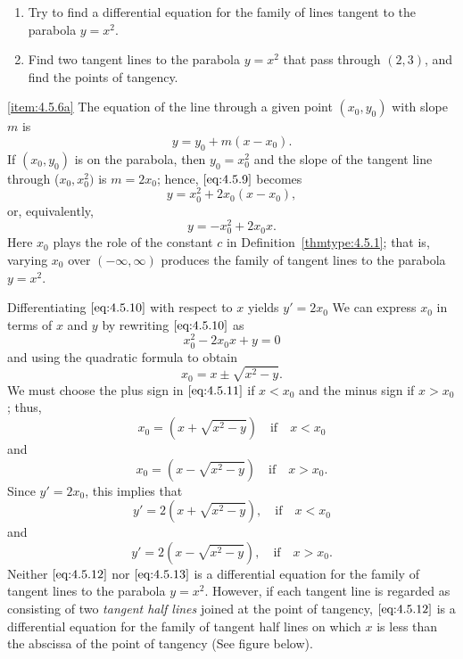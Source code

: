 \documentclass{ximera}
\begin{document}
\begin{example}\label{example:4.5.6}
 
\begin{enumerate}
\item\label{item:4.5.6a} %
Try to find a differential equation for the family of lines tangent
to the parabola $y=x^2$.
 
\item\label{item:4.5.6b} %
Find two tangent lines to  the parabola $y=x^2$ that pass
through $(2,3)$, and find the points of tangency.
\end{enumerate}
 
 
\begin{explanation} \ref{item:4.5.6a} The equation of the line through a given point
$(x_0,y_0)$ with slope $m$ is
\begin{equation}  \label{eq:4.5.9}
y=y_0+m(x-x_0).
\end{equation}
If $(x_0,y_0)$ is on the parabola, then $y_0=x_0^2$ and the slope of
the tangent line through ($x_0,x_0^2)$ is $m=2x_0$; hence,
$\eqref{eq:4.5.9}$ becomes
$$
y=x_0^2+2x_0(x-x_0),
$$
 or, equivalently,
\begin{equation} \label{eq:4.5.10}
y=-x_0^2+2x_0x.
\end{equation}
Here $x_0$ plays the role of the constant $c$ in
Definition~\ref{thmtype:4.5.1}; that is, varying $x_0$ over
$(-\infty,\infty)$ produces the family of tangent lines to the
parabola $y=x^2$.
 
 
Differentiating $\eqref{eq:4.5.10}$ with respect to $x$ yields
$y'=2x_0$
We can express $x_0$ in terms of $x$ and $y$ by rewriting
$\eqref{eq:4.5.10}$ as
$$
x_0^2-2x_0x+y=0
$$
and using the quadratic formula to obtain
 \begin{equation}\label{eq:4.5.11}
 x_0=x\pm\sqrt{x^2-y}.
\end{equation}
We must choose the plus sign in $\eqref{eq:4.5.11}$ if $x<x_0$
and the minus sign if $x>x_0$;   thus,
$$
x_0=\left(x+\sqrt{x^2-y}\right)\quad\mbox{if}\quad x<x_0
$$
 and
$$
x_0=\left(x-\sqrt{x^2-y}\right)\quad\mbox{if}\quad x>x_0.
$$
Since $y'=2x_0$, this implies that
\begin{equation} \label{eq:4.5.12}
y'=2\left(x+\sqrt{x^2-y}\right),\quad\mbox{if}\quad x<x_0
\end{equation}
 and
\begin{equation} \label{eq:4.5.13}
y'=2\left(x-\sqrt{x^2-y}\right),\quad \mbox{if}\quad x>x_0.
\end{equation}
Neither $\eqref{eq:4.5.12}$ nor $\eqref{eq:4.5.13}$ is a differential equation for
the family of tangent lines to the parabola $y=x^2$. However, if each
tangent line is regarded as consisting of two \textit{tangent half
lines} joined at the point of tangency,   $\eqref{eq:4.5.12}$ is a
differential equation for the family of tangent half lines on which
$x$ is less than the abscissa of the point of tangency
(See figure below).


\end{explanation}
\end{example}
\end{document}
